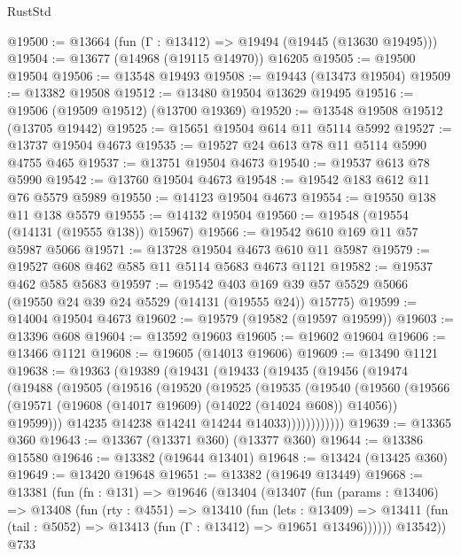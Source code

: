 \begin{lexlean}{RustStd}
\begin{coremodule}
@19500 := @13664 (fun (Γ : @13412) => @19494 (@19445 (@13630 @19495)))
@19504 := @13677 (@14968 (@19115 @14970)) @16205
@19505 := @19500 @19504
@19506 := @13548 @19493
@19508 := @19443 (@13473 @19504)
@19509 := @13382 @19508
@19512 := @13480 @19504 @13629 @19495
@19516 := @19506 (@19509 @19512) (@13700 @19369)
@19520 := @13548 @19508 @19512 (@13705 @19442)
@19525 := @15651 @19504 @614 @11 @5114 @5992
@19527 := @13737 @19504 @4673
@19535 := @19527 @24 @613 @78 @11 @5114 @5990 @4755 @465
@19537 := @13751 @19504 @4673
@19540 := @19537 @613 @78 @5990
@19542 := @13760 @19504 @4673
@19548 := @19542 @183 @612 @11 @76 @5579 @5989
@19550 := @14123 @19504 @4673
@19554 := @19550 @138 @11 @138 @5579
@19555 := @14132 @19504
@19560 := @19548 (@19554 (@14131 (@19555 @138)) @15967)
@19566 := @19542 @610 @169 @11 @57 @5987 @5066
@19571 := @13728 @19504 @4673 @610 @11 @5987
@19579 := @19527 @608 @462 @585 @11 @5114 @5683 @4673 @1121
@19582 := @19537 @462 @585 @5683
@19597 := @19542
    @403
    @169
    @39
    @57
    @5529
    @5066
    (@19550 @24 @39 @24 @5529 (@14131 (@19555 @24)) @15775)
@19599 := @14004 @19504 @4673
@19602 := @19579 (@19582 (@19597 @19599))
@19603 := @13396 @608
@19604 := @13592 @19603
@19605 := @19602 @19604
@19606 := @13466 @1121
@19608 := @19605 (@14013 @19606)
@19609 := @13490 @1121
@19638 := @19363
    (@19389
      (@19431
        (@19433
          (@19435
            (@19456
              (@19474
                (@19488
                  (@19505
                    (@19516
                      (@19520
                        (@19525
                          (@19535
                            (@19540
                              (@19560
                                (@19566
                                  (@19571 (@19608 (@14017 @19609) (@14022 (@14024 @608)) @14056))
                                  @19599)))
                            @14235
                            @14238
                            @14241
                            @14244
                            @14033))))))))))))
@19639 := @13365 @360
@19643 := @13367 (@13371 @360) (@13377 @360)
@19644 := @13386 @15580
@19646 := @13382 (@19644 @13401)
@19648 := @13424 (@13425 @360)
@19649 := @13420 @19648
@19651 := @13382 (@19649 @13449)
@19668 := @13381
    (fun (fn : @131) =>
    @19646
      (@13404
        (@13407
          (fun (params : @13406) =>
          @13408
            (fun (rty : @4551) =>
            @13410
              (fun (lets : @13409) =>
              @13411 (fun (tail : @5052) => @13413 (fun (Γ : @13412) => @19651 @13496))))))
        @13542))
    @733

\end{coremodule}
\end{lexlean}
